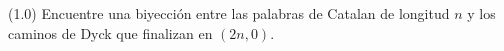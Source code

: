 (1.0) Encuentre una biyección entre las palabras de Catalan de longitud $n$ y los caminos de Dyck que finalizan en $(2n,0)$.
